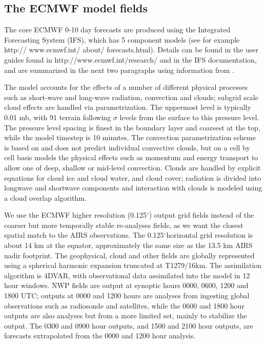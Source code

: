 \documentclass[agupp]{aguplus}              %
\newcommand{\mydeg}{\mbox{$^\circ$}}
\begin{document}
\begin{article}
\subsection{The ECMWF model fields}
\label{ECMWF_cloud}

The core ECMWF 0-10 day forecasts are
produced using the Integrated Forecasting System (IFS), which has 5
component models (see for example http:// www.ecmwf.int/ about/
forecasts.html). Details can be found in the user
guides found in http://www.ecmwf.int/research/ and in the IFS
documentation, and are summarized in the next two paragraphs using
information from \citep{upp:05,dee:11*2}.

The model accounts for the effects of a number of different physical
processes such as short-wave and long-wave radiation, convection and
clouds; subgrid scale cloud effects are handled via parametrization.
The uppermost level is typically 0.01 mb, with 91 terrain following
$\sigma$ levels from the surface to this pressure level. The pressure
level spacing is finest in the boundary layer and coarsest at the top,
while the model timestep is 10 minutes. The convection parametrization
scheme is based on \citep{tie:89} and does not predict individual
convective clouds, but on a cell by cell basis models the physical
effects such as momentum and energy transport to allow one of deep,
shallow or mid-level convection. Clouds are handled by
explicit equations for cloud ice and cloud water, and cloud cover;
radiation is divided into longwave and shortwave components and
interaction with clouds is modeled using a cloud overlap algorithm.

We use the ECMWF higher resolution (0.125\mydeg) output grid fields
instead of the coarser but more temporally stable re-analyses fields,
as we want the closest spatial match to the AIRS
observations. The 0.125\mydeg horizontal grid resolution is about 14
km at the equator, approximately the same size as the 13.5 km AIRS
nadir footprint. The geophysical, cloud and other fields are globally
represented using a spherical harmonic expansion truncated at
T1279/16km. The assimilation algorithm is 4DVAR, with observational
data assimilated into the model in 12 hour windows. NWP fields are
output at synoptic hours 0000, 0600, 1200 and 1800 UTC; outputs at
0000 and 1200 hours are analyses from ingesting global observations
such as radiosonde and satellites, while the 0600 and 1800 hour
outputs are also analyses but from a more limited set, mainly to
stabilize the output. The 0300 and 0900 hour outputs, and 1500 and
2100 hour outputs, are forecasts extrapolated from the 0000 and 1200
hour analysis.


\end{article}
\end{document}
